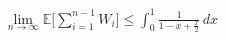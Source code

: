 \documentclass[preview]{standalone}
\begin{document}
\begin{align*}
\lim_{n\to\infty} \mathbb{E} \Bigg[ \sum_{i=1}^{n-1} W_i \Bigg] \leq \int_{0}^{1} \frac{1}{1-x + \frac{x}{2}} \, dx
\end{align*}
\end{document}
